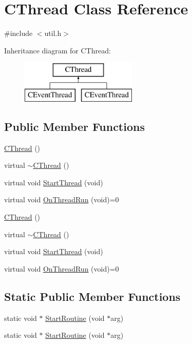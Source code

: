 \hypertarget{class_c_thread}{}\section{C\+Thread Class Reference}
\label{class_c_thread}


{\ttfamily \#include $<$util.\+h$>$}

Inheritance diagram for C\+Thread\+:\begin{figure}[H]
\begin{center}
\leavevmode
\includegraphics[height=2.000000cm]{class_c_thread}
\end{center}
\end{figure}
\subsection*{Public Member Functions}
\begin{DoxyCompactItemize}
\item 
\hyperlink{class_c_thread_ad256868eded3b90abee1b5f656bb678e}{C\+Thread} ()
\item 
virtual \hyperlink{class_c_thread_a85a583b2edf56a6448e71e3a9ad301d2}{$\sim$\+C\+Thread} ()
\item 
virtual void \hyperlink{class_c_thread_a76897a8f3a57f1acbec44599c4dc2315}{Start\+Thread} (void)
\item 
virtual void \hyperlink{class_c_thread_afe1bfa3f5be22b19c0dbd4c7c29d670c}{On\+Thread\+Run} (void)=0
\item 
\hyperlink{class_c_thread_ad256868eded3b90abee1b5f656bb678e}{C\+Thread} ()
\item 
virtual \hyperlink{class_c_thread_aaa6753fc8114c0eac21f9726b791cfa2}{$\sim$\+C\+Thread} ()
\item 
virtual void \hyperlink{class_c_thread_a82d41c0abec6b8dc073d77631a6ab3f8}{Start\+Thread} (void)
\item 
virtual void \hyperlink{class_c_thread_afe1bfa3f5be22b19c0dbd4c7c29d670c}{On\+Thread\+Run} (void)=0
\end{DoxyCompactItemize}
\subsection*{Static Public Member Functions}
\begin{DoxyCompactItemize}
\item 
static void $\ast$ \hyperlink{class_c_thread_a02b1c05e14956d21badc48dd06d8a845}{Start\+Routine} (void $\ast$arg)
\item 
static void $\ast$ \hyperlink{class_c_thread_a945a0bc4af2c91d97fef2339fd3e559b}{Start\+Routine} (void $\ast$arg)
\end{DoxyCompactItemize}
